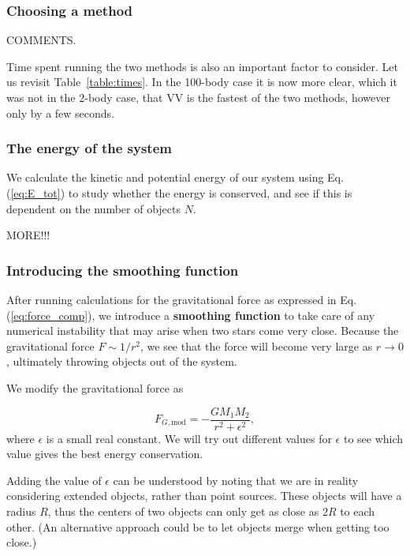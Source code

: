 \documentclass{article}
\begin{document}
\begin{multicols}{2}
\subsubsection{Choosing a method}
COMMENTS.

Time spent running the two methods is also an important factor to consider. Let us revisit Table~\ref{table:times}. In the 100-body case it is now more clear, which it was not in the 2-body case, that VV is the fastest of the two methods, however only by a few seconds. 


\subsubsection{The energy of the system}

We calculate the kinetic and potential energy of our system using Eq. (\ref{eq:E_tot}) to study whether the energy is conserved, and see if this is dependent on the number of objects $N$.

MORE!!!



\subsubsection{Introducing the smoothing function}

After running calculations for the gravitational force as expressed in Eq. (\ref{eq:force_comp}), we introduce a \textbf{smoothing function} to take care of any numerical instability that may arise when two stars come very close. Because the gravitational force $F \sim 1/r^2$, we see that the force will become very large as $r \rightarrow 0$, ultimately throwing objects out of the system. 

We modify the gravitational force as

\begin{equation}\label{eq:force_mod}
	F_{G,\mathrm{mod}} = - \frac{G M_1 M_2}{r^2 + \epsilon^2},
\end{equation}
where $\epsilon$ is a small real constant. We will try out different values for $\epsilon$ to see which value gives the best energy conservation.

Adding the value of $\epsilon$ can be understood by noting that we are in reality considering extended objects, rather than point sources. These objects will have a radius $R$, thus the centers of two objects can only get as close as $2R$ to each other. (An alternative approach could be to let objects merge when getting too close.) 


\end{multicols}
\end{document}
